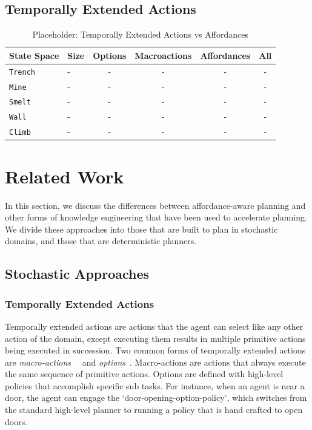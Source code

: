 \documentclass[conference]{IEEEtran}
\begin{document}
\subsection{Temporally Extended Actions}

\begin{table}[H]
\centering
\begin{tabular}{ l l || c c c c }
  State Space 		&	Size 	&	Options 	& Macroactions & Affordances  & 	All 	\\ \hline
  \texttt{Trench}  	& 	-	&	-		&	-	&	-			&	-	\\
  \texttt{Mine}  		& 	-	&	-		&	-	&	-  			&	-	\\
  \texttt{Smelt}  		& 	-	&	-		&	-	&	-  			&	-	\\
  \texttt{Wall}  		& 	-	&	-		&	-	&	-			&	-	\\
  \texttt{Climb}  		& 	-	&	-		&	-	&	- 			&	-	\\
\end{tabular}
\caption{Placeholder: Temporally Extended Actions vs Affordances}
\label{table:minecraft_results_cpu}
\end{table}

\section{Related Work}
\label{sec:related-work}

In this section, we discuss the differences between
affordance-aware planning and other forms of knowledge engineering that
have been used to accelerate planning. We divide these approaches
into those that are built to plan in stochastic domains, and those that are
deterministic planners.

\subsection{Stochastic Approaches}

\subsubsection{Temporally Extended Actions}
Temporally extended actions are actions that the agent can
select like any other action of the domain, except executing them
results in multiple primitive actions being executed in
succession. Two common forms of temporally extended actions are {\em
  macro-actions}~\cite{hauskrecht98} ~and {\em options}~\cite{sutton99}. 
Macro-actions are actions that always
execute the same sequence of primitive actions. Options are defined
with high-level policies that accomplish specific sub tasks. For
instance, when an agent is near a door, the agent can engage the
`door-opening-option-policy', which switches from the standard
high-level planner to running a policy that is hand crafted to open
doors. 
\end{document}
